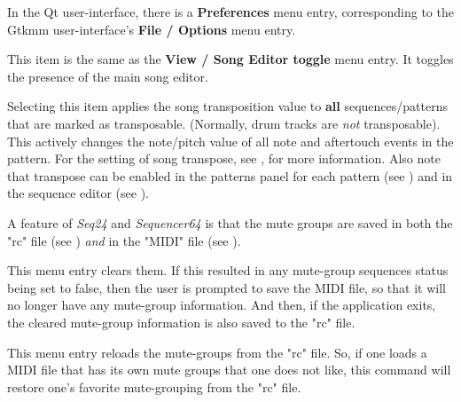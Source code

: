    \setcounter{ItemCounter}{0}      %

   In the Qt user-interface, there is a \textbf{Preferences} menu entry,
   corresponding to the Gtkmm user-interface's \textbf{File / Options}
   menu entry.

   This item is the same as the 
   \textbf{View / Song Editor toggle} menu entry.  It toggles the presence of
   the main song editor.

   Selecting this item applies the song transposition value to
   \textbf{all} sequences/patterns that are marked as transposable.
   (Normally, drum tracks are \textsl{not} transposable).
   This actively changes the note/pitch value of all note and aftertouch events
   in the pattern.
   For the setting of song transpose, see
   , for more information.
   Also note that transpose can be enabled in the patterns panel for each
   pattern (see ) and
   in the sequence editor
   (see ).

   A feature of \textsl{Seq24} and \textsl{Sequencer64} is that the mute groups
   are saved in both the "rc" file
   (see )
   \textsl{and} in the "MIDI" file
   (see ).

   This menu entry clears them. If this resulted in any mute-group sequences
   status being set to false, then the user is prompted to save the MIDI
   file, so that it will no longer have any
   mute-group information.  And then, if the
   application exits, the cleared mute-group information is also saved to
   the "rc" file.

   This menu entry reloads the mute-groups from the "rc" file.
   So, if one loads a MIDI file that has its own mute groups that one does not
   like, this command will restore one's favorite mute-grouping from the "rc"
   file.

